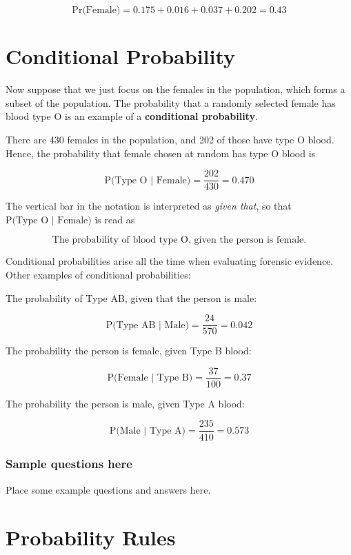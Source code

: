 \documentclass[
]{book}
\begin{document}
\[
\mbox{Pr(Female)} = 0.175 + 0.016 + 0.037 + 0.202 = 0.43 
\]

\hypertarget{conditional-probability-1}{%
\chapter{Conditional Probability}\label{conditional-probability-1}}

Now suppose that we just focus on the females in the population, which forms a subset of the population.
The probability that a randomly selected female has blood type O is an example of a \textbf{conditional probability}.

There are 430 females in the population, and 202 of those have type O blood.
Hence, the probability that female chosen at random has type O blood is

\[
\mbox{P(Type O | Female)} = \frac{202}{430} = 0.470
\]

The vertical bar in the notation is interpreted as \emph{given that}, so that \(\mbox{P(Type O | Female)}\) is read as

\[
\mbox{The probability of blood type O, given the person is female.}
\]

Conditional probabilities arise all the time when evaluating forensic evidence. Other examples of conditional probabilities:

The probability of Type AB, given that the person is male:

\[
\mbox{P(Type AB | Male)} = \frac{24}{570} = 0.042
\]

The probability the person is female, given Type B blood:

\[
\mbox{P(Female | Type B)} = \frac{37}{100} = 0.37
\]

The probability the person is male, given Type A blood:

\[
\mbox{P(Male | Type A)} = \frac{235}{410} = 0.573
\]

\hypertarget{sample-questions-here-2}{%
\subsection{Sample questions here}\label{sample-questions-here-2}}

Place some example questions and answers here.

\hypertarget{probability-rules}{%
\chapter{Probability Rules}\label{probability-rules}}
\end{document}
